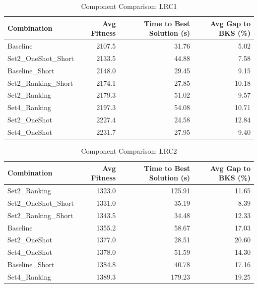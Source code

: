 \documentclass{article}
\begin{document}
\begin{table}[htbp]
\centering
\caption{Component Comparison: LRC1}
\label{tab:comparison_lrc1}
\begin{tabular}{lrrr}
\toprule
Combination & Avg Fitness & Time to Best Solution (s) & Avg Gap to BKS (\%) \\
\midrule
Baseline & 2107.5 & 31.76 & 5.02 \\
Set2\_OneShot\_Short & 2133.5 & 44.88 & 7.58 \\
Baseline\_Short & 2148.0 & 29.45 & 9.15 \\
Set2\_Ranking\_Short & 2174.1 & 27.85 & 10.18 \\
Set2\_Ranking & 2179.3 & 51.02 & 9.57 \\
Set4\_Ranking & 2197.3 & 54.08 & 10.71 \\
Set2\_OneShot & 2227.4 & 24.58 & 12.84 \\
Set4\_OneShot & 2231.7 & 27.95 & 9.40 \\
\bottomrule
\end{tabular}
\end{table}

\begin{table}[htbp]
\centering
\caption{Component Comparison: LRC2}
\label{tab:comparison_lrc2}
\begin{tabular}{lrrr}
\toprule
Combination & Avg Fitness & Time to Best Solution (s) & Avg Gap to BKS (\%) \\
\midrule
Set2\_Ranking & 1323.0 & 125.91 & 11.65 \\
Set2\_OneShot\_Short & 1331.0 & 35.19 & 8.39 \\
Set2\_Ranking\_Short & 1343.5 & 34.48 & 12.33 \\
Baseline & 1355.2 & 58.67 & 17.03 \\
Set2\_OneShot & 1377.0 & 28.51 & 20.60 \\
Set4\_OneShot & 1378.0 & 51.59 & 14.30 \\
Baseline\_Short & 1384.8 & 40.78 & 17.16 \\
Set4\_Ranking & 1389.3 & 179.23 & 19.25 \\
\bottomrule
\end{tabular}
\end{table}
\end{document}
